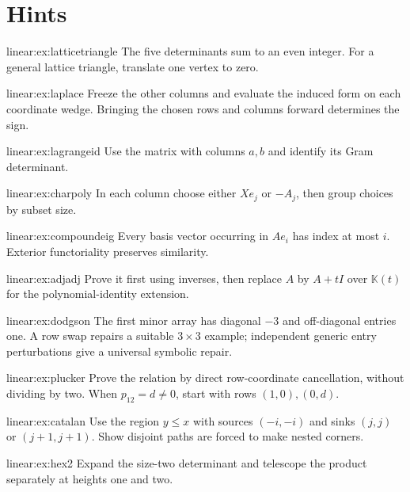 \section{Hints}
\begin{hint}{linear:ex:latticetriangle}
The five determinants sum to an even integer. For a general lattice triangle, translate one vertex to zero.
\end{hint}
\begin{hint}{linear:ex:laplace}
Freeze the other columns and evaluate the induced form on each coordinate wedge. Bringing the chosen rows and columns forward determines the sign.
\end{hint}
\begin{hint}{linear:ex:lagrangeid}
Use the matrix with columns $a,b$ and identify its Gram determinant.
\end{hint}
\begin{hint}{linear:ex:charpoly}
In each column choose either $Xe_j$ or $-A_j$, then group choices by subset size.
\end{hint}
\begin{hint}{linear:ex:compoundeig}
Every basis vector occurring in $Ae_i$ has index at most $i$. Exterior functoriality preserves similarity.
\end{hint}
\begin{hint}{linear:ex:adjadj}
Prove it first using inverses, then replace $A$ by $A+tI$ over $\mathbb K(t)$ for the polynomial-identity extension.
\end{hint}
\begin{hint}{linear:ex:dodgson}
The first minor array has diagonal $-3$ and off-diagonal entries one. A row swap repairs a suitable $3\times3$ example; independent generic entry perturbations give a universal symbolic repair.
\end{hint}
\begin{hint}{linear:ex:plucker}
Prove the relation by direct row-coordinate cancellation, without dividing by two. When $p_{12}=d\ne0$, start with rows $(1,0),(0,d)$.
\end{hint}
\begin{hint}{linear:ex:catalan}
Use the region $y\le x$ with sources $(-i,-i)$ and sinks $(j,j)$ or $(j+1,j+1)$. Show disjoint paths are forced to make nested corners.
\end{hint}
\begin{hint}{linear:ex:hex2}
Expand the size-two determinant and telescope the product separately at heights one and two.
\end{hint}
